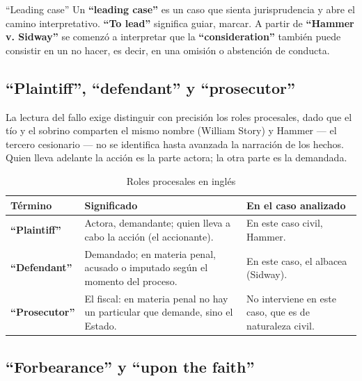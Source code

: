 \documentclass[12pt,oneside]{book}
\begin{document}
\begin{definition}{``Leading case''}
Un \textbf{``leading case''} es un caso que sienta jurisprudencia y abre el camino interpretativo. \textbf{``To lead''} significa guiar, marcar. A partir de \textbf{``Hammer v. Sidway''} se comenzó a interpretar que la \textbf{``consideration''} también puede consistir en un no hacer, es decir, en una omisión o abstención de conducta.
\end{definition}

\subsection{\texorpdfstring{``Plaintiff'', ``defendant'' y ``prosecutor''}{Plaintiff, defendant y prosecutor}}

La lectura del fallo exige distinguir con precisión los roles procesales, dado que el tío y el sobrino comparten el mismo nombre (William Story) y Hammer --- el tercero cesionario --- no se identifica hasta avanzada la narración de los hechos. Quien lleva adelante la acción es la parte actora; la otra parte es la demandada.

\begin{table}[H]
\centering
\caption{Roles procesales en inglés}
\begin{tabularx}{\textwidth}{
    >{\raggedright\arraybackslash}p{}
    >{\raggedright\arraybackslash}X
    >{\raggedright\arraybackslash}p{}
}
\toprule
\textbf{Término} & \textbf{Significado} & \textbf{En el caso analizado} \\
\midrule
\textbf{``Plaintiff''} & Actora, demandante; quien lleva a cabo la acción (el accionante). & En este caso civil, Hammer. \\
\textbf{``Defendant''} & Demandado; en materia penal, acusado o imputado según el momento del proceso. & En este caso, el albacea (Sidway). \\
\textbf{``Prosecutor''} & El fiscal: en materia penal no hay un particular que demande, sino el Estado. & No interviene en este caso, que es de naturaleza civil. \\
\bottomrule
\end{tabularx}
\end{table}

\subsection{\texorpdfstring{``Forbearance'' y ``upon the faith''}{Forbearance y upon the faith}}
\end{document}
